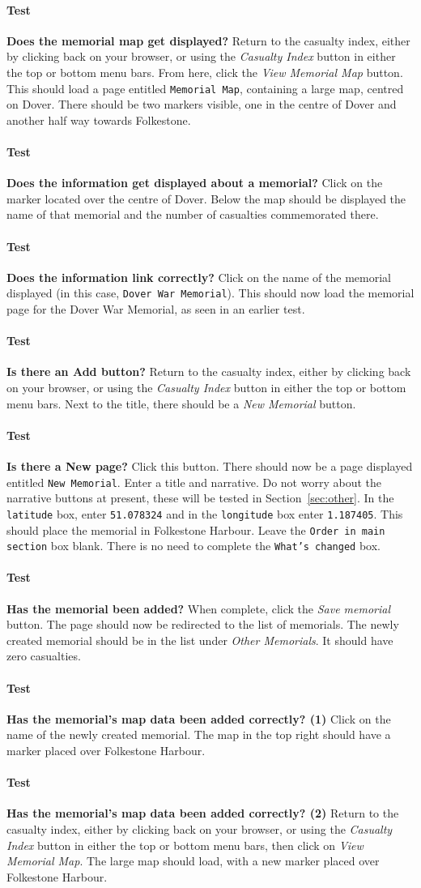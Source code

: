 \documentclass[12pt]{article}
\newcounter{Test}
\newcommand{\test}[1]{%
\stepcounter{Test}%
\paragraph{Test \theTest} \textbf{#1} }
\begin{document}
\test{Does the memorial map get displayed?}
Return to the casualty index, either by clicking back on your browser, or using the \textit{Casualty Index} button in either the top or bottom menu bars. From here, click the \textit{View Memorial Map} button. This should load a page entitled \texttt{Memorial Map}, containing a large map, centred on Dover. There should be two markers visible, one in the centre of Dover and another half way towards Folkestone.

\test{Does the information get displayed about a memorial?}
Click on the marker located over the centre of Dover. Below the map should be displayed the name of that memorial and the number of casualties commemorated there.

\test{Does the information link correctly?}
Click on the name of the memorial displayed (in this case, \texttt{Dover War Memorial}). This should now load the memorial page for the Dover War Memorial, as seen in an earlier test.

\test{Is there an Add button?}
Return to the casualty index, either by clicking back on your browser, or using the \textit{Casualty Index} button in either the top or bottom menu bars. Next to the title, there should be a \textit{New Memorial} button.

\test{Is there a New page?}
Click this button. There should now be a page displayed entitled \texttt{New Memorial}. Enter a title and narrative. Do not worry about the narrative buttons at present, these will be tested in Section~\ref{sec:other}. In the \texttt{latitude} box, enter \texttt{51.078324} and in the \texttt{longitude} box enter \texttt{1.187405}. This should place the memorial in Folkestone Harbour. Leave the \texttt{Order in main section} box blank. There is no need to complete the \texttt{What's changed} box.

\test{Has the memorial been added?}
When complete, click the \textit{Save memorial} button. The page should now be redirected to the list of memorials. The newly created memorial should be in the list under \textit{Other Memorials}. It should have zero casualties.

\test{Has the memorial's map data been added correctly? (1)}
Click on the name of the newly created memorial. The map in the top right should have a marker placed over Folkestone Harbour.

\test{Has the memorial's map data been added correctly? (2)}
Return to the casualty index, either by clicking back on your browser, or using the \textit{Casualty Index} button in either the top or bottom menu bars, then click on \textit{View Memorial Map}. The large map should load, with a new marker placed over Folkestone Harbour. 
\end{document}
